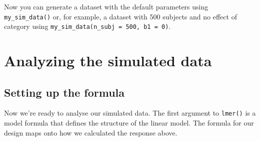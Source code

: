 \documentclass[
  english,
  doc,floatsintext]{apa6}
\newenvironment{Shaded}{\begin{snugshade}}{\end{snugshade}}
\newcommand{\DataTypeTok}[1]{\textcolor[rgb]{0.13,0.29,0.53}{#1}}
\newcommand{\DecValTok}[1]{\textcolor[rgb]{0.00,0.00,0.81}{#1}}
\newcommand{\KeywordTok}[1]{\textcolor[rgb]{0.13,0.29,0.53}{\textbf{#1}}}
\newcommand{\NormalTok}[1]{#1}
\newcommand{\OperatorTok}[1]{\textcolor[rgb]{0.81,0.36,0.00}{\textbf{#1}}}
\newcommand{\StringTok}[1]{\textcolor[rgb]{0.31,0.60,0.02}{#1}}
\begin{document}
\begin{Shaded}
\end{Shaded}

Now you can generate a dataset with the default parameters using \texttt{my\_sim\_data()} or, for example, a dataset with 500 subjects and no effect of category using \texttt{my\_sim\_data(n\_subj\ =\ 500,\ b1\ =\ 0)}.

\hypertarget{analyzing-the-simulated-data}{%
\section{Analyzing the simulated data}\label{analyzing-the-simulated-data}}

\hypertarget{setting-up-the-formula}{%
\subsection{Setting up the formula}\label{setting-up-the-formula}}

Now we're ready to analyse our simulated data. The first argument to \texttt{lmer()} is a model formula that defines the structure of the linear model. The formula for our design maps onto how we calculated the response above.
\end{document}
